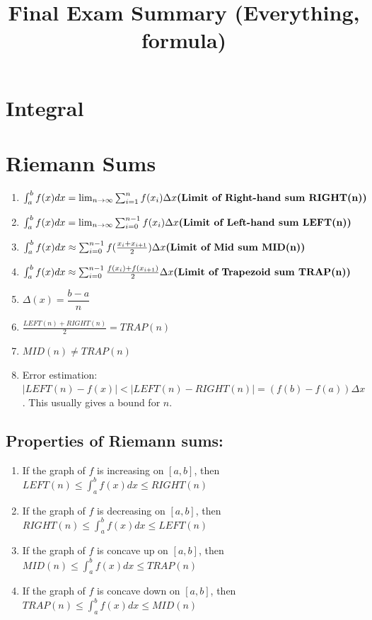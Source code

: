 \documentclass[12pt]{article}
\date{}
\title{Final Exam Summary (Everything, formula)}
\theoremstyle{definition}
\theoremstyle{definition}
\theoremstyle{remark}
\theoremstyle{definition}
\theoremstyle{definition}
\theoremstyle{definition}
\begin{document}
\maketitle
\section{Integral}
\section{Riemann Sums}
\begin{enumerate}
	\item$\int_a^bf(x)dx= \lim_{n\rightarrow \infty} \sum_{i=1}^n f(x_i)\Delta x\text{\bf (Limit of Right-hand sum RIGHT(n))}$

	\item$\int_a^bf(x)dx= \lim_{n\rightarrow \infty} \sum_{i=0}^{n-1} f(x_i)\Delta x\text{\bf (Limit of Left-hand sum LEFT(n))}$

	\item$\int_a^bf(x)dx\approx  \sum_{i=0}^{n-1} f(\frac{x_i+x_{i+1}}{2})\Delta x\text{\bf (Limit of Mid sum MID(n))}$

	\item$\int_a^bf(x)dx\approx \sum_{i=0}^{n-1} \frac{f(x_i)+f(x_{i+1})}{2}\Delta x\text{\bf (Limit of Trapezoid sum TRAP(n))}$

	\item$\Delta(x)=\dfrac{b-a}{n}$

	\item$\frac{LEFT(n)+RIGHT(n)}{2}=TRAP(n)$
	\item$MID(n)\neq TRAP(n)$

	\item Error estimation: $|LEFT(n) - f(x)|<|LEFT(n)-RIGHT(n)|=(f(b)-f(a))\Delta x$. This usually gives a bound for $n$.
\end{enumerate}



\subsection{Properties of Riemann sums:}
\begin{enumerate}
\item If the graph of $f$ is increasing on $[a,b]$, then $LEFT(n)\leq \int^b_a f(x) dx \leq RIGHT(n)$
\item If the graph of $f$ is decreasing on $[a,b]$, then $RIGHT(n)\leq \int^b_a f(x) dx \leq LEFT(n)$
\item If the graph of $f$ is concave up on $[a,b]$, then $MID(n)\leq \int^b_a f(x) dx \leq TRAP(n)$
\item If the graph of $f$ is concave down on $[a,b]$, then $TRAP(n)\leq \int^b_a f(x) dx \leq MID(n)$
\end{enumerate}
\end{document}
